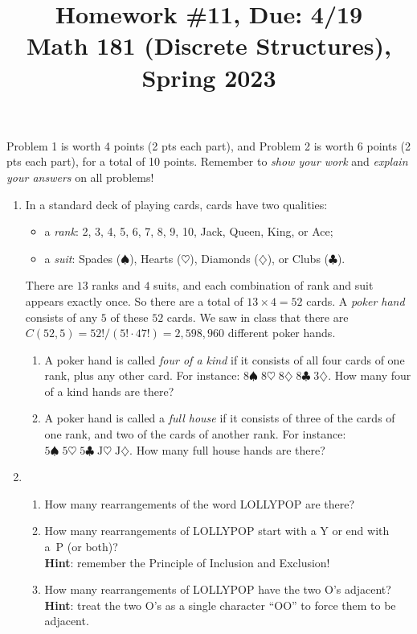 \documentclass[11pt]{article}
\title{Homework \#11, Due: 4/19 \\Math 181 (Discrete Structures), Spring 2023}
\date{}
\begin{document}
\maketitle

\thispagestyle{empty}

\vspace{-1cm}

Problem 1 is worth 4 points (2 pts each part), and Problem 2 is worth 6 points (2 pts each part), for a total of 10 points. Remember to \emph{show your work} and \emph{explain your answers} on all problems!

\begin{enumerate}

\item In a standard deck of playing cards, cards have two qualities:
\begin{itemize}
\item a \emph{rank}: 2, 3, 4, 5, 6, 7, 8, 9, 10, Jack, Queen, King, or Ace;
\item a \emph{suit}: Spades ($\spadesuit$), Hearts ($\heartsuit$), Diamonds ($\diamondsuit$), or Clubs ($\clubsuit$).
\end{itemize}
There are $13$ ranks and $4$ suits, and each combination of rank and suit appears exactly once. So there are a total of $13 \times 4 = 52$ cards. A \emph{poker hand} consists of any $5$ of these $52$ cards. We saw in class that there are $C(52,5) = 52!/(5! \cdot 47!)=2,598,960$ different poker hands.
\begin{enumerate}
\item A poker hand is called \emph{four of a kind} if it consists of all four cards of one rank, plus any other card. For instance: $8\spadesuit \; 8\heartsuit \; 8\diamondsuit \; 8\clubsuit \; 3\diamondsuit$. How many four of a kind hands are there?
\item A poker hand is called a \emph{full house} if it consists of three of the cards of one rank, and two of the cards of another rank. For instance: $5\spadesuit \; 5\heartsuit \; 5\clubsuit \; \mathrm{J}\heartsuit \; \mathrm{J}\diamondsuit$. How many full house hands are there?
\end{enumerate}

\item \begin{enumerate}
\item How many rearrangements of the word LOLLYPOP are there?
\item How many rearrangements of LOLLYPOP start with a Y or end with a~P (or both)? \\ {\bf Hint}: remember the Principle of Inclusion and Exclusion!
\item How many rearrangements of LOLLYPOP have the two O's adjacent? \\ {\bf Hint}: treat the two O's as a single character ``OO'' to force them to be adjacent.
\end{enumerate}

\end{enumerate}
\end{document}
